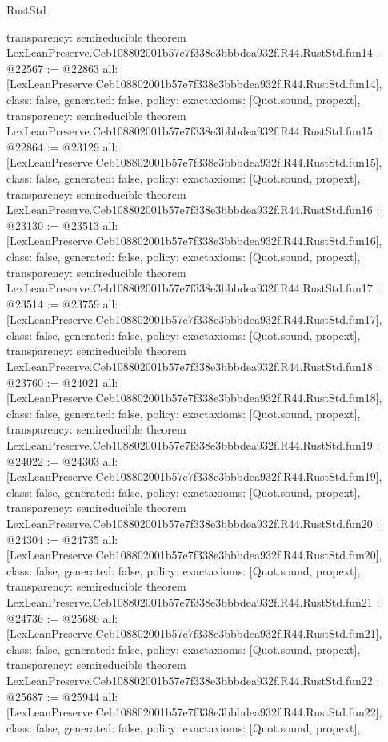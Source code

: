 \begin{lexlean}{RustStd}
\begin{coremodule}
{  transparency: semireducible
}
theorem LexLeanPreserve.Ceb108802001b57e7f338e3bbbdea932f.R44.RustStd.fun14 : @22567 := @22863 {
  all: [LexLeanPreserve.Ceb108802001b57e7f338e3bbbdea932f.R44.RustStd.fun14],
  class: false,
  generated: false,
  policy: exact{axioms: [Quot.sound, propext]},
  transparency: semireducible
}
theorem LexLeanPreserve.Ceb108802001b57e7f338e3bbbdea932f.R44.RustStd.fun15 : @22864 := @23129 {
  all: [LexLeanPreserve.Ceb108802001b57e7f338e3bbbdea932f.R44.RustStd.fun15],
  class: false,
  generated: false,
  policy: exact{axioms: [Quot.sound, propext]},
  transparency: semireducible
}
theorem LexLeanPreserve.Ceb108802001b57e7f338e3bbbdea932f.R44.RustStd.fun16 : @23130 := @23513 {
  all: [LexLeanPreserve.Ceb108802001b57e7f338e3bbbdea932f.R44.RustStd.fun16],
  class: false,
  generated: false,
  policy: exact{axioms: [Quot.sound, propext]},
  transparency: semireducible
}
theorem LexLeanPreserve.Ceb108802001b57e7f338e3bbbdea932f.R44.RustStd.fun17 : @23514 := @23759 {
  all: [LexLeanPreserve.Ceb108802001b57e7f338e3bbbdea932f.R44.RustStd.fun17],
  class: false,
  generated: false,
  policy: exact{axioms: [Quot.sound, propext]},
  transparency: semireducible
}
theorem LexLeanPreserve.Ceb108802001b57e7f338e3bbbdea932f.R44.RustStd.fun18 : @23760 := @24021 {
  all: [LexLeanPreserve.Ceb108802001b57e7f338e3bbbdea932f.R44.RustStd.fun18],
  class: false,
  generated: false,
  policy: exact{axioms: [Quot.sound, propext]},
  transparency: semireducible
}
theorem LexLeanPreserve.Ceb108802001b57e7f338e3bbbdea932f.R44.RustStd.fun19 : @24022 := @24303 {
  all: [LexLeanPreserve.Ceb108802001b57e7f338e3bbbdea932f.R44.RustStd.fun19],
  class: false,
  generated: false,
  policy: exact{axioms: [Quot.sound, propext]},
  transparency: semireducible
}
theorem LexLeanPreserve.Ceb108802001b57e7f338e3bbbdea932f.R44.RustStd.fun20 : @24304 := @24735 {
  all: [LexLeanPreserve.Ceb108802001b57e7f338e3bbbdea932f.R44.RustStd.fun20],
  class: false,
  generated: false,
  policy: exact{axioms: [Quot.sound, propext]},
  transparency: semireducible
}
theorem LexLeanPreserve.Ceb108802001b57e7f338e3bbbdea932f.R44.RustStd.fun21 : @24736 := @25686 {
  all: [LexLeanPreserve.Ceb108802001b57e7f338e3bbbdea932f.R44.RustStd.fun21],
  class: false,
  generated: false,
  policy: exact{axioms: [Quot.sound, propext]},
  transparency: semireducible
}
theorem LexLeanPreserve.Ceb108802001b57e7f338e3bbbdea932f.R44.RustStd.fun22 : @25687 := @25944 {
  all: [LexLeanPreserve.Ceb108802001b57e7f338e3bbbdea932f.R44.RustStd.fun22],
  class: false,
  generated: false,
  policy: exact{axioms: [Quot.sound, propext]},
}
\end{coremodule}
\end{lexlean}
